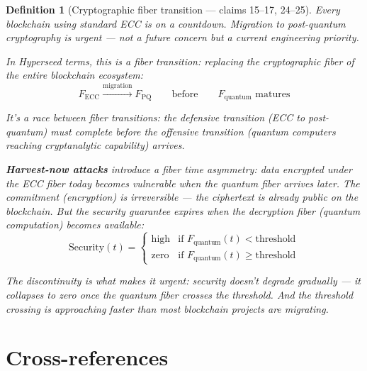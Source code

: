 \documentclass[11pt,a4paper]{article}
\newtheorem{definition}{Definition}[section]
\begin{document}
\begin{definition}[Cryptographic fiber transition --- claims 15--17, 24--25]
\label{def:transition}
Every blockchain using standard ECC is on a countdown. Migration to
post-quantum cryptography is urgent --- not a future concern but a
current engineering priority.

In Hyperseed terms, this is a \emph{fiber transition}: replacing the
cryptographic fiber of the entire blockchain ecosystem:
\[
  F_{\text{ECC}} \xrightarrow{\text{migration}} F_{\text{PQ}}
  \qquad \text{before} \qquad
  F_{\text{quantum}} \text{ matures}
\]

It's a race between fiber transitions: the defensive transition
(ECC to post-quantum) must complete before the offensive transition
(quantum computers reaching cryptanalytic capability) arrives.

\textbf{Harvest-now attacks} introduce a \emph{fiber time asymmetry}:
data encrypted under the ECC fiber today becomes vulnerable when the
quantum fiber arrives later. The commitment (encryption) is irreversible
--- the ciphertext is already public on the blockchain. But the security
guarantee expires when the decryption fiber (quantum computation) becomes
available:
\[
  \text{Security}(t) = \begin{cases}
    \text{high} & \text{if } F_{\text{quantum}}(t) < \text{threshold} \\
    \text{zero} & \text{if } F_{\text{quantum}}(t) \geq \text{threshold}
  \end{cases}
\]

The discontinuity is what makes it urgent: security doesn't degrade
gradually --- it collapses to zero once the quantum fiber crosses the
threshold. And the threshold crossing is approaching faster than most
blockchain projects are migrating.
\end{definition}

\section{Cross-references}
\end{document}
